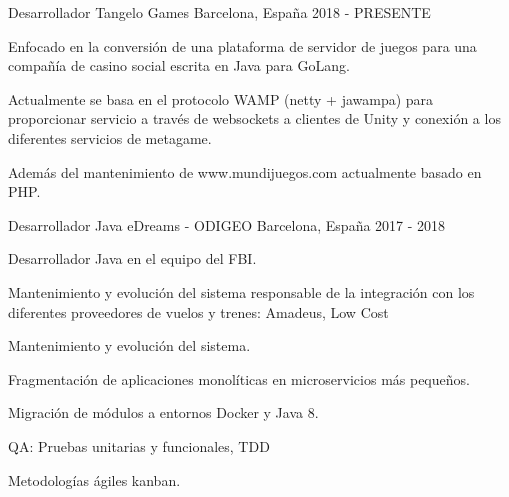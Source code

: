 

\begin{cventries}

  \cventry
    {Desarrollador} %
    {Tangelo Games} %
    {Barcelona, España} %
    {2018 - PRESENTE} %
    {
      \begin{cvitems} %
        \item {Enfocado en la conversión de una plataforma de servidor de juegos para una compañía de casino social escrita en Java para GoLang.}
        \item {Actualmente se basa en el protocolo WAMP (netty + jawampa) para proporcionar servicio a través de websockets a clientes de Unity y conexión a los diferentes servicios de metagame.}
        \item {Además del mantenimiento de www.mundijuegos.com actualmente basado en PHP.}
      \end{cvitems}
    }


  \cventry
    {Desarrollador Java} %
    {eDreams - ODIGEO} %
    {Barcelona, España} %
    {2017 - 2018} %
    {
      \begin{cvitems} %
        \item {Desarrollador Java en el equipo del FBI.}
        \item {Mantenimiento y evolución del sistema responsable de la integración con los diferentes proveedores de vuelos y trenes: Amadeus, Low Cost}
        \item {Mantenimiento y evolución del sistema.}
        \item {Fragmentación de aplicaciones monolíticas en microservicios más pequeños.}
        \item {Migración de módulos a entornos Docker y Java 8.}
        \item {QA: Pruebas unitarias y funcionales, TDD}
        \item {Metodologías ágiles kanban.}
      \end{cvitems}
    }


\end{cventries}
